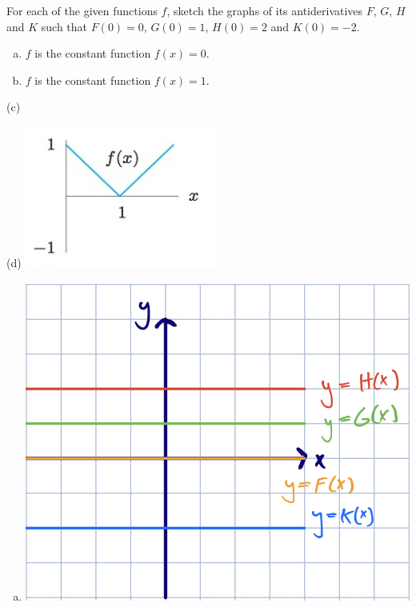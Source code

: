 \documentclass[11pt]{exam}
\begin{document}
\begin{questions}
  \question For each of the given functions $f$, sketch the graphs of its antiderivatives $F$, $G$, $H$ and $K$ such that $F(0)=0$, $G(0)=1$, $H(0)=2$ and $K(0)=-2$.
\begin{multicols}{2}
\begin{enumerate}[(a)]
\item $f$ is the constant function $f(x)=0$.	
\item $f$ is the constant function $f(x)=1$.	
\end{enumerate}
\end{multicols}
\begin{minipage}{0.5\linewidth}
  (c)
\end{minipage}
\begin{minipage}{0.5\linewidth}
  (d) \includegraphics[width=2.5in]{Figures/no7.jpg}
\end{minipage}
\begin{solution}
  \begin{multicols}{2}
    \begin{enumerate}[(a)]
    \item \includegraphics[scale=0.4]{Figures/1a}

\end{enumerate}
\end{multicols}
\end{solution}
\end{questions}
\end{document}
